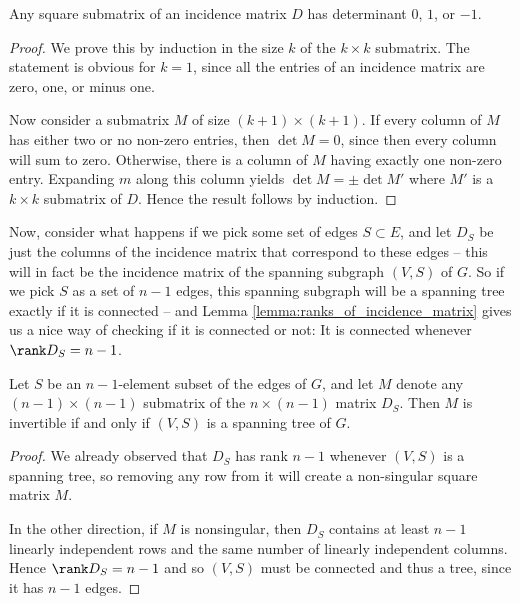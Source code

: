 \documentclass[nobib]{tufte-handout}
\begin{document}
\begin{lemma}\label{lemma:square_submats_of_incmat}
    Any square submatrix of an incidence matrix $D$ has determinant $0$, $1$, or $-1$.

    \begin{proof}
        We prove this by induction in the size $k$ of the $k\times k$ submatrix. The statement is obvious for $k=1$, since all the entries of an incidence matrix are zero, one, or minus one.

        Now consider a submatrix $M$ of size $(k+1)\times(k+1)$. If every column of $M$ has either two or no non-zero entries, then $\det M = 0$, since then every column will sum to zero. Otherwise, there is a column of $M$ having exactly one non-zero entry. Expanding $m$ along this column yields $\det M = \pm \det M'$ where $M'$ is a $k \times k$ submatrix of $D$. Hence the result follows by induction.
    \end{proof}
\end{lemma}

Now, consider what happens if we pick some set of edges $S \subset E$, and let $D_S$ be just the columns of the incidence matrix that correspond to these edges -- this will in fact be the incidence matrix of the spanning subgraph $(V, S)$ of $G$. So if we pick $S$ as a set of $n-1$ edges, this spanning subgraph will be a spanning tree exactly if it is connected -- and Lemma \ref{lemma:ranks_of_incidence_matrix} gives us a nice way of checking if it is connected or not: It is connected whenever $\rank D_S = n - 1$.

\begin{lemma}\label{lemma:invertible_iff_spanningtree}
    Let $S$ be an $n-1$-element subset of the edges of $G$, and let $M$ denote any $(n-1)\times (n-1)$ submatrix of the $n \times (n-1)$ matrix $D_S$. Then $M$ is invertible if and only if $(V,S)$ is a spanning tree of $G$.

    \begin{proof}
        We already observed that $D_S$ has rank $n-1$ whenever $(V,S)$ is a spanning tree, so removing any row from it will create a non-singular square matrix $M$.

        In the other direction, if $M$ is nonsingular, then $D_S$ contains at least $n-1$ linearly independent rows and the same number of linearly independent columns. Hence $\rank D_S = n - 1$ and so $(V,S)$ must be connected and thus a tree, since it has $n-1$ edges.
    \end{proof}
\end{lemma}
\end{document}
